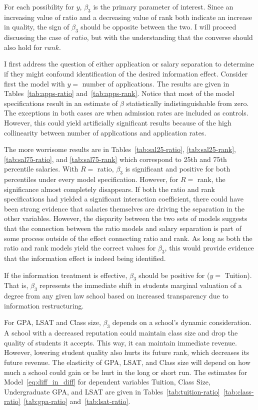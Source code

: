 \documentclass[12pt]{article}
\theoremstyle{definition}
\begin{document}
For each possibility for $y$, $\beta_3$ is the primary parameter of interest. Since an increasing value of ratio and a decreasing value of rank both indicate an increase in quality, the sign of $\beta_3$ should be opposite between the two. I will proceed discussing the case of $ratio$, but with the understanding that the converse should also hold for $rank$.

I first address the question of either application or salary separation to determine if they might confound identification of the desired information effect. Consider first the model with $y=$ number of applications. The results are given in Tables~\ref{tab:apps-ratio} and~\ref{tab:apps-rank}. Notice that most of the model specifications result in an estimate of $\beta$ statistically indistinguishable from zero. The exceptions in both cases are when admission rates are included as controls. However, this could yield artificially significant results because of the high collinearity between number of applications and application rates.

The more worrisome results are in Tables~\ref{tab:sal25-ratio}, \ref{tab:sal25-rank}, \ref{tab:sal75-ratio}, and \ref{tab:sal75-rank} which correspond to 25th and 75th percentile salaries. With $R=$ ratio, $\beta_3$ is significant and positive for both percentiles under every model specification. However, for $R=$ rank, the significance almost completely disappears. If both the ratio and rank specifications had yielded a significant interaction coefficient, there could have been strong evidence that salaries themselves are driving the separation in the other variables. However, the disparity between the two sets of models suggests that the connection between the ratio models and salary separation is part of some process outside of the effect connecting ratio and rank. As long as both the ratio and rank models yield the correct values for $\beta_3$, this would provide evidence that the information effect is indeed being identified. 

If the information treatment is effective, $\beta_3$ should be positive for ($y=$ Tuition). That is, $\beta_3$ represents the immediate shift in students marginal valuation of a degree from any given law school based on increased transparency due to information restructuring.

For GPA, LSAT and Class size, $\beta_3$ depends on a school's dynamic consideration. A school with a decreased reputation could maintain class size and drop the quality of students it accepts. This way, it can maintain immediate revenue. However, lowering student quality also hurts its future rank, which decreases its future revenue. The elasticity of GPA, LSAT, and Class size will depend on how much a school could gain or be hurt in the long or short run. The estimates for Model~\eqref{eq:diff_in_diff} for dependent variables Tuition, Class Size, Undergraduate GPA, and LSAT are given in Tables~\ref{tab:tuition-ratio}~\ref{tab:class-ratio}~\ref{tab:gpa-ratio} and~\ref{tab:lsat-ratio}.
\end{document}
